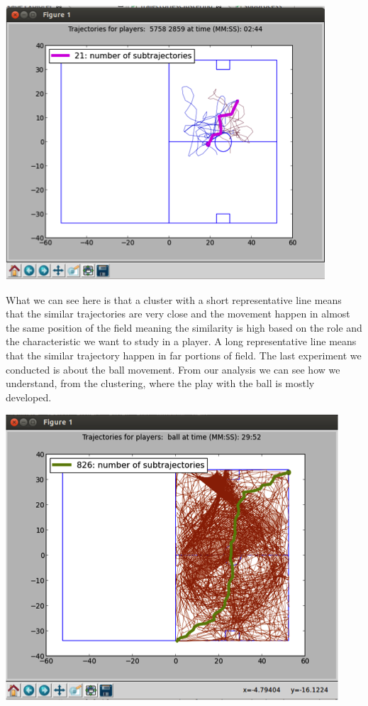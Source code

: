 \documentclass{acm_proc_article-sp-sigmod07}
\begin{document}
\includegraphics{experimental7}

What we can see here is that a cluster with a short representative line means that the similar trajectories are very close and the movement happen in almost the same position of the field meaning the similarity is high based on the role and the characteristic we want to study in a player. A long representative line means that the similar trajectory happen in far portions of field.  The last experiment we conducted is about the ball movement. From our analysis we can see how we understand, from the clustering, where the play with the ball is mostly developed.


\includegraphics{experimental8}
\end{document}
